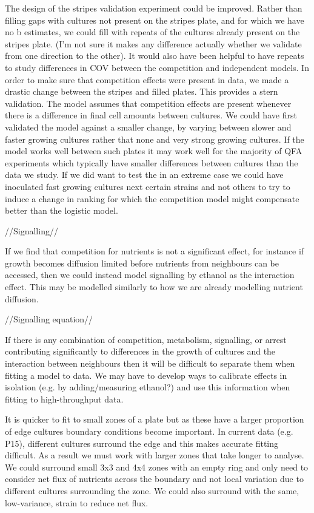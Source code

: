 The design of the stripes validation experiment could be
improved. Rather than filling gaps with cultures not present on the
stripes plate, and for which we have no b estimates, we could fill
with repeats of the cultures already present on the stripes
plate. (I'm not sure it makes any difference actually whether we
validate from one direction to the other). It would also have been
helpful to have repeats to study differences in COV between the
competition and independent models. In order to make sure that
competition effects were present in data, we made a drastic change
between the stripes and filled plates. This provides a stern
validation. The model assumes that competition effects are present
whenever there is a difference in final cell amounts between
cultures. We could have first validated the model against a smaller
change, by varying between slower and faster growing cultures rather
that none and very strong growing cultures. If the model works well
between such plates it may work well for the majority of QFA
experiments which typically have smaller differences between cultures
than the data we study. If we did want to test the in an extreme case
we could have inoculated fast growing cultures next certain strains
and not others to try to induce a change in ranking for which the
competition model might compensate better than the logistic model.

//Signalling//

If we find that competition for nutrients is not a significant effect,
for instance if growth becomes diffusion limited before nutrients from
neighbours can be accessed, then we could instead model signalling by
ethanol as the interaction effect. This may be modelled similarly to
how we are already modelling nutrient diffusion.

//Signalling equation//

If there is any combination of competition, metabolism, signalling, or
arrest contributing significantly to differences in the growth of
cultures and the interaction between neighbours then it will be
difficult to separate them when fitting a model to data. We may have
to develop ways to calibrate effects in isolation (e.g. by
adding/measuring ethanol?) and use this information when fitting to
high-throughput data.

It is quicker to fit to small zones of a plate but as these have a
larger proportion of edge cultures boundary conditions become
important. In current data (e.g. P15), different cultures surround the
edge and this makes accurate fitting difficult. As a result we must
work with larger zones that take longer to analyse. We could surround
small 3x3 and 4x4 zones with an empty ring and only need to consider
net flux of nutrients across the boundary and not local variation due
to different cultures surrounding the zone. We could also surround
with the same, low-variance, strain to reduce net flux.

